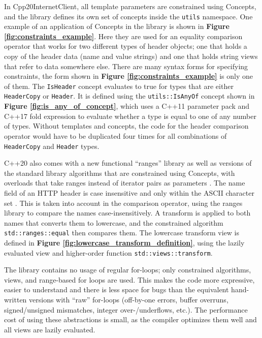 \documentclass[12pt, a4paper]{article}
\begin{document}
In Cpp20InternetClient, all template parameters are constrained using Concepts, and the library defines its own set of concepts inside the \texttt{utils} namespace. One example of an application of Concepts in the library is shown in \textbf{Figure \ref{fig:constraints_example}}. Here they are used for an equality comparison operator that works for two different types of header objects; one that holds a copy of the header data (name and value strings) and one that holds string views that refer to data somewhere else. There are many syntax forms for specifying constraints, the form shown in \textbf{Figure \ref{fig:constraints_example}} is only one of them. The \texttt{IsHeader} concept evaluates to true for types that are either \texttt{HeaderCopy} or \texttt{Header}. It is defined using the \texttt{utils::IsAnyOf} concept shown in \textbf{Figure \ref{fig:is_any_of_concept}}, which uses a C++11 parameter pack and C++17 fold expression \parencite{CppFoldExpression} to evaluate whether a type is equal to one of any number of types. Without templates and concepts, the code for the header comparison operator would have to be duplicated four times for all combinations of \texttt{HeaderCopy} and \texttt{Header} types.

C++20 also comes with a new functional “ranges” library \parencite{CppRanges} as well as versions of the standard library algorithms that are constrained using Concepts, with overloads that take ranges instead of iterator pairs as parameters \parencite{CppConstrainedAlgorithms}. The name field of an HTTP header is case insensitive and only within the ASCII character set \parencite[][Section 4.2]{HttpSpec}. This is taken into account in the comparison operator, using the ranges library to compare the names case-insensitively. A transform is applied to both names that converts them to lowercase, and the constrained algorithm \texttt{std::ranges::equal} then compares them. The lowercase transform view is defined in \textbf{Figure \ref{fig:lowercase_transform_definition}}, using the lazily evaluated view and higher-order function \texttt{std::views::transform}. 

The library contains no usage of regular for-loops; only constrained algorithms, views, and range-based for loops are used. This makes the code more expressive, easier to understand and there is less space for bugs than the equivalent hand-written versions with “raw” for-loops (off-by-one errors, buffer overruns, signed/unsigned mismatches, integer over-/underflows, etc.). The performance cost of using these abstractions is small, as the compiler optimizes them well and all views are lazily evaluated. 
\end{document}
